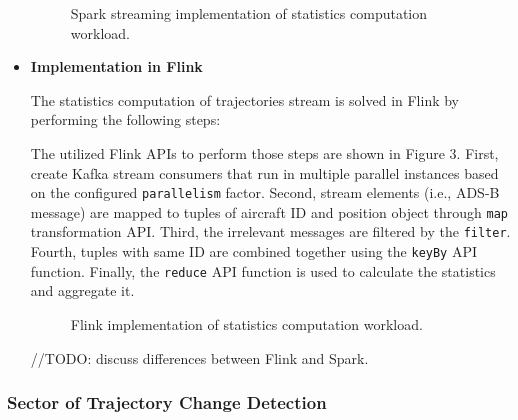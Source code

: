 \documentclass[]{article}
\begin{document}
\begin{itemize}
\begin{figure}[h]
 
  \centering
  
     \caption{Spark streaming implementation of statistics computation workload.}
\end{figure} 

\item {\bf{Implementation in Flink }}

The statistics computation of trajectories stream is solved in Flink by performing the following steps: 

\par The utilized Flink APIs to perform those steps are shown in Figure 3. First, create Kafka stream consumers that run in multiple parallel instances based on the configured \texttt{parallelism} factor. Second,  stream elements (i.e., ADS-B message) are mapped  to tuples of aircraft ID and  position object through \texttt{map} transformation API. Third, the irrelevant messages are filtered by the \texttt{filter}. Fourth, tuples with same ID are combined together using the \texttt{keyBy} API function. Finally, the \texttt{reduce} API function is used to calculate the statistics and aggregate it.

\begin{figure}[h]
 
  \centering
  
     \caption{Flink implementation of statistics computation workload.}
\end{figure}


//TODO: discuss differences between Flink and Spark.

\end{itemize}

\subsubsection{Sector of Trajectory Change Detection}
\end{document}
